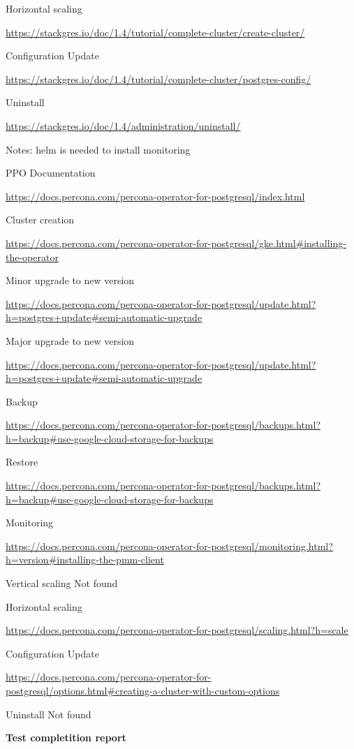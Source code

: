 Horizontal scaling

\url{https://stackgres.io/doc/1.4/tutorial/complete-cluster/create-cluster/}

Configuration Update

\url{https://stackgres.io/doc/1.4/tutorial/complete-cluster/postgres-config/}

Uninstall

\url{https://stackgres.io/doc/1.4/administration/uninstall/}

Notes: helm is needed to install monitoring

PPO
Documentation

\url{https://docs.percona.com/percona-operator-for-postgresql/index.html}

Cluster creation

\url{https://docs.percona.com/percona-operator-for-postgresql/gke.html#installing-the-operator}

Minor upgrade to new version

\url{https://docs.percona.com/percona-operator-for-postgresql/update.html?h=postgres+update#semi-automatic-upgrade}

Major upgrade to new version

\url{https://docs.percona.com/percona-operator-for-postgresql/update.html?h=postgres+update#semi-automatic-upgrade}

Backup

\url{https://docs.percona.com/percona-operator-for-postgresql/backups.html?h=backup#use-google-cloud-storage-for-backups}

Restore

\url{https://docs.percona.com/percona-operator-for-postgresql/backups.html?h=backup#use-google-cloud-storage-for-backups}

Monitoring

\url{https://docs.percona.com/percona-operator-for-postgresql/monitoring.html?h=version#installing-the-pmm-client}

Vertical scaling
Not found

Horizontal scaling

\url{https://docs.percona.com/percona-operator-for-postgresql/scaling.html?h=scale}

Configuration Update

\url{https://docs.percona.com/percona-operator-for-postgresql/options.html#creating-a-cluster-with-custom-options}

Uninstall
Not found

\textbf{Test completition report}

